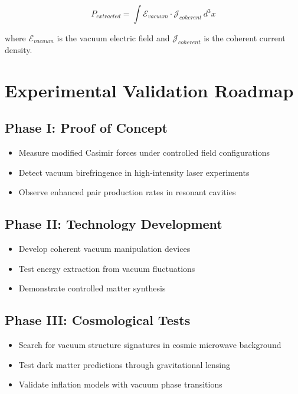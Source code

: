 \documentclass[12pt,a4paper]{article}
\begin{document}
\begin{equation}
P_{extracted} = \int \mathcal{E}_{vacuum} \cdot \mathcal{J}_{coherent} \, d^3x
\end{equation}

where $\mathcal{E}_{vacuum}$ is the vacuum electric field and $\mathcal{J}_{coherent}$ is the coherent current density.

\section{Experimental Validation Roadmap}

\subsection{Phase I: Proof of Concept}
\begin{itemize}
    \item Measure modified Casimir forces under controlled field configurations
    \item Detect vacuum birefringence in high-intensity laser experiments
    \item Observe enhanced pair production rates in resonant cavities
\end{itemize}

\subsection{Phase II: Technology Development}
\begin{itemize}
    \item Develop coherent vacuum manipulation devices
    \item Test energy extraction from vacuum fluctuations
    \item Demonstrate controlled matter synthesis
\end{itemize}

\subsection{Phase III: Cosmological Tests}
\begin{itemize}
    \item Search for vacuum structure signatures in cosmic microwave background
    \item Test dark matter predictions through gravitational lensing
    \item Validate inflation models with vacuum phase transitions
\end{itemize}
\end{document}
